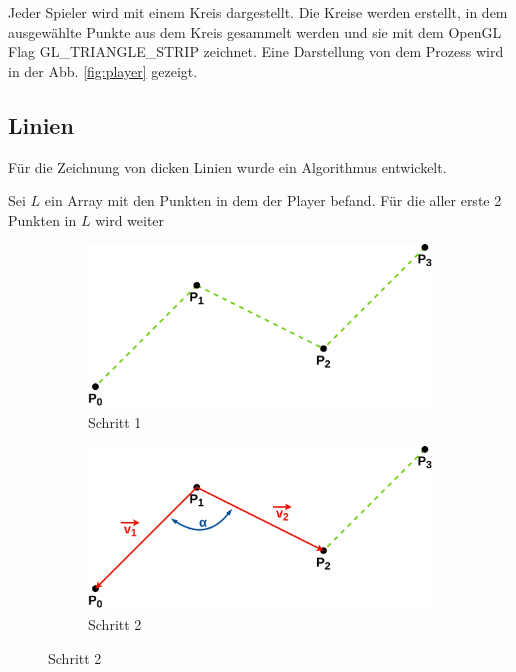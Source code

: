 \documentclass[doktyp=studarbeit]{TUBAFarbeiten}
\begin{document}
Jeder Spieler wird mit einem Kreis dargestellt. Die Kreise werden erstellt, in
dem ausgewählte Punkte aus dem Kreis gesammelt werden und sie mit dem 
OpenGL Flag GL\_TRIANGLE\_STRIP zeichnet. Eine Darstellung von dem Prozess
wird in der Abb. \ref{fig:player} gezeigt.

\subsection{Linien}

Für die Zeichnung von dicken Linien wurde ein Algorithmus entwickelt.

Sei $L$ ein Array mit den Punkten in dem der Player befand.
Für die aller erste 2 Punkten in $L$ wird weiter

\begin{figure}[!htb]
    \centering
    \begin{subfigure}[b]{0.45\textwidth}
        \centering
        \includegraphics[width=1\linewidth]{Schlangenlinie-1.png}
        \caption{Schritt 1}
    \end{subfigure}
    \qquad
    \begin{subfigure}[b]{0.45\textwidth}
        \centering
        \includegraphics[width=1\linewidth]{Schlangenlinie-2.png}
        \caption{Schritt 2}
    \end{subfigure}

\end{figure}
\end{document}
